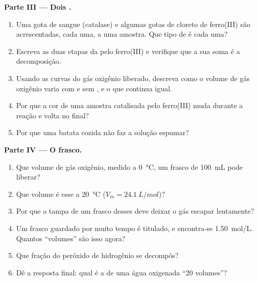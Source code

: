 \begin{problem}
\medskip
\noindent\textbf{Parte III --- Dois .}
\begin{enumerate}[resume]
  \item Uma gota de sangue (catalase) e algumas gotas de cloreto de
        ferro(III) são acrescentadas, cada uma, a uma amostra. Que tipo
        de  é cada uma?
  \item Escreva as duas etapas da  pelo ferro(III) e verifique
        que a sua soma é a decomposição.
  \item Usando as curvas do gás oxigênio liberado, descreva como o volume
        de gás oxigênio varia com e sem , e o que continua
        igual.
  \item Por que a cor de uma amostra catalisada pelo ferro(III) muda
        durante a reação e volta no final?
  \item Por que uma batata cozida não faz a solução espumar?
\end{enumerate}

\medskip
\noindent\textbf{Parte IV --- O frasco.}
\begin{enumerate}[resume]
  \item Que volume de gás oxigênio, medido a \qty{0}{\celsius}, um frasco
        de \qty{100}{mL} pode liberar?
  \item Que volume é esse a \qty{20}{\celsius} ($V_m =
        \qty{24.1}{L/mol}$)?
  \item Por que a tampa de um frasco desses deve deixar o gás escapar
        lentamente?
  \item Um frasco guardado por muito tempo é titulado, e encontra-se
        \qty{1.50}{mol/L}. Quantos ``volumes'' são isso agora?
  \item Que fração do peróxido de hidrogênio se decompôs?
  \item Dê a resposta final: qual é a  de uma água
        oxigenada ``20 volumes''?
\end{enumerate}
\end{problem}
